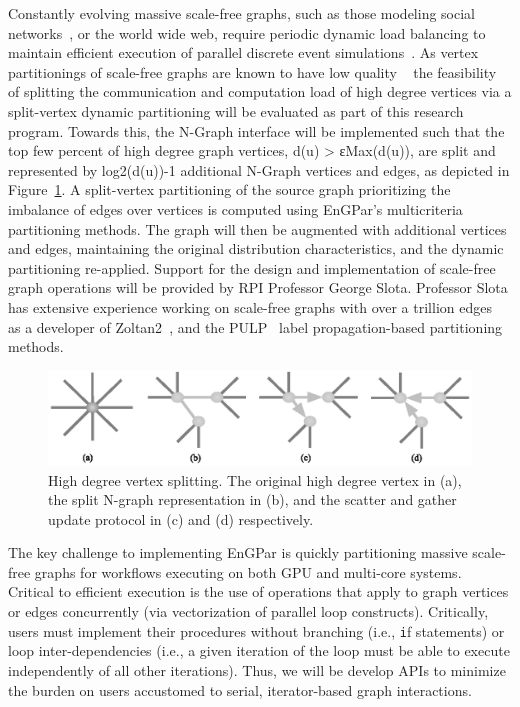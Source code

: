 \documentclass{article}
\begin{document}
Constantly evolving massive scale-free graphs, such as those modeling social
networks~\cite{twitter2010,kwak2010twitter}, or the world wide web, require
periodic dynamic load balancing to maintain efficient execution of parallel
discrete event simulations~\cite{carothers2002ross}.
As vertex partitionings of scale-free graphs are known to have low quality
~\cite{abou2006multilevel,lang2004finding,leskovec2009community,pienta2013parallel}
the feasibility of splitting the communication and computation load of high
degree vertices via a split-vertex dynamic partitioning will be evaluated as
part of this research program.
Towards this, the N-Graph interface will be implemented such
that the top few percent of high degree graph vertices, d(u) > εMax(d(u)), are
split and represented by log2(d(u))-1 additional N-Graph vertices and edges, as
depicted in Figure~\ref{fig:vtxSplitting}.
A split-vertex partitioning of the source graph prioritizing the imbalance of
edges over vertices is computed using EnGPar’s multicriteria partitioning
methods.
The graph will then be augmented with additional vertices and edges,
maintaining the original distribution characteristics, and the dynamic
partitioning re-applied.
Support for the design and implementation of scale-free graph operations will be
provided by RPI Professor George Slota.
Professor Slota has extensive experience working on scale-free graphs with over
a trillion edges~\cite{slota_ipdps2017} as a developer of Zoltan2~\cite{zoltan2}, and the
PULP~\cite{slota_ipdps2017} label propagation-based partitioning methods.

\begin{figure}
  \includegraphics[width=\textwidth]{../ngraph/vtxSplitting.eps}
  \caption{\label{fig:vtxSplitting}
    High degree vertex splitting. 
    The original high degree vertex in (a), the split N-graph representation in
    (b), and the scatter and gather update protocol in (c) and (d) respectively.
  }
\end{figure}

The key challenge to implementing EnGPar is quickly partitioning massive
scale-free graphs for workflows executing on both GPU and multi-core systems.
Critical to efficient execution is the use of operations that apply to graph
vertices or edges concurrently (via vectorization of parallel loop constructs).
Critically, users must implement their procedures without branching (i.e.,
{\texttt if} statements) or loop inter-dependencies
(i.e., a given iteration of the loop must be able to execute independently of
all other iterations).
Thus, we will be develop APIs to minimize the burden on users accustomed to
serial, iterator-based graph interactions.
\end{document}
